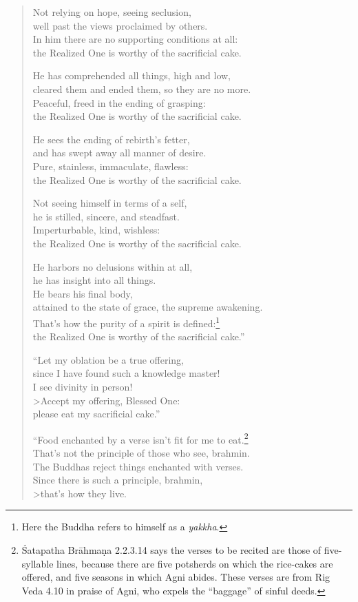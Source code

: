 \documentclass[12pt,openany]{book}%
\begin{document}
\begin{verse}
Not relying on hope, seeing seclusion, \\
well past the views proclaimed by others. \\
In him there are no supporting conditions at all: \\
the Realized One is worthy of the sacrificial cake. 

He has comprehended all things, high and low, \\
cleared them and ended them, so they are no more. \\
Peaceful, freed in the ending of grasping: \\
the Realized One is worthy of the sacrificial cake. 

He sees the ending of rebirth’s fetter, \\
and has swept away all manner of desire. \\
Pure, stainless, immaculate, flawless: \\
the Realized One is worthy of the sacrificial cake. 

Not seeing himself in terms of a self, \\
he is stilled, sincere, and steadfast. \\
Imperturbable, kind, wishless: \\
the Realized One is worthy of the sacrificial cake. 

He harbors no delusions within at all, \\
he has insight into all things. \\
He bears his final body, \\
attained to the state of grace, the supreme awakening. \\
That’s how the purity of a spirit is defined:\footnote{Here the Buddha refers to himself as a \textit{yakkha}. } \\
the Realized One is worthy of the sacrificial cake.” 

“Let my oblation be a true offering, \\
since I have found such a knowledge master! \\
I see divinity in person! \\>Accept my offering, Blessed One: \\
please eat my sacrificial cake.” 

“Food enchanted by a verse isn’t fit for me to eat.\footnote{Śatapatha \textsanskrit{Brāhmaṇa} 2.2.3.14 says the verses to be recited are those of five-syllable lines, because there are five potsherds on which the rice-cakes are offered, and five seasons in which Agni abides. These verses are from Rig Veda 4.10 in praise of Agni, who expels the “baggage” of sinful deeds. } \\
That’s not the principle of those who see, brahmin. \\
The Buddhas reject things enchanted with verses. \\
Since there is such a principle, brahmin, \\>that’s how they live. 


\end{verse}
\end{document}
